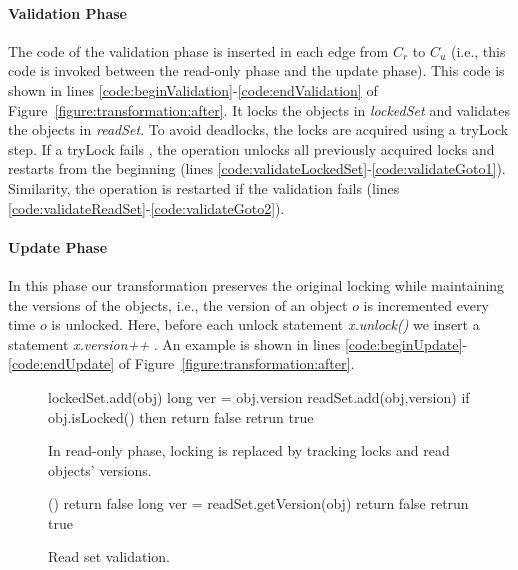\paragraph{Validation Phase}
The code of the validation phase is inserted in each edge from $C_r$ to $C_u$ (i.e., this code is invoked between the read-only phase and the update phase).
This code is shown in lines \ref{code:beginValidation}-\ref{code:endValidation} of Figure~\ref{figure:transformation:after}.
It locks the objects in \emph{lockedSet} and validates the objects in \emph{readSet}.
To avoid deadlocks, the locks are acquired using a tryLock
step. 
If a tryLock fails , the operation unlocks  all
previously acquired locks and restarts from the beginning
(lines \ref{code:validateLockedSet}-\ref{code:validateGoto1}).
Similarity, the operation is restarted if the validation fails (lines \ref{code:validateReadSet}-\ref{code:validateGoto2}).  

\paragraph{Update Phase}
In this phase our transformation preserves the original locking while maintaining the versions of the objects, i.e., the version of an object $o$ is incremented every time $o$ is unlocked.
Here, before each unlock statement \emph{\ttfamily x.unlock()} we insert a statement \emph{\ttfamily x.version++} .
An example is shown in lines \ref{code:beginUpdate}-\ref{code:endUpdate} of Figure~\ref{figure:transformation:after}.


\begin{figure}
\scriptsize
\begin{algorithmic}[1]{}
		{\ttfamily
		\State lockedSet.add(obj) \label{code:lockedSet:add}
			\State long ver = obj.version \label{code:track:getVersion}
			\State readSet.add(obj,version)
			\State if {obj.isLocked()} then return false \label{code:track:returnFalse}
			\State retrun true
		\EndFunction
		}
\end{algorithmic}
\caption{ In read-only phase, locking is replaced by
tracking locks and read
objects' versions.
\label{figure::track}}
\end{figure}




\begin{figure}
\scriptsize
\begin{algorithmic}[1]{}
		{\ttfamily
		()
			\State return false 
			\EndIf
			\State long ver = readSet.getVersion(obj)
				\State return false 
			\EndIf
		\EndFor
		\State retrun true 
		\EndFunction
		}
\end{algorithmic}
\caption{Read set validation.\label{figure::validate}}
\end{figure}


